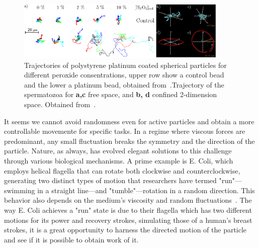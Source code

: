 \begin{figure}[h]
  \begin{center}
    \includegraphics[width=0.90\textwidth]{figures/randomwalk.pdf}
  \end{center}
  \caption[Random Walk for active brownian particles.]{Trajectories of polystyrene platinum coated spherical particles for different peroxide consentrations, upper row show a control bead and the lower a platinum bead, obtained from~\cite{howse2007self}.Trajectory of the spermatozoa for \textbf{a,c} free space, and \textbf{b, d} confined 2-dimension space. Obtained from~\cite{corkidi2008tracking}.}\label{fig:corkidiexperiment}
\end{figure}



It seems we cannot avoid randomness even for active particles and obtain a more controllable movemente for specific tasks. In a regime where viscous forces are predominant, any small fluctuation breaks the symmetry and the direction of the particle. Nature, as always, has evolved elegant solutions to this challenge through various biological mechanisms. A prime example is E. Coli, which employs helical flagella that can rotate both clockwise and counterclockwise, generating two distinct types of motion that researchers have termed "run"—swimming in a straight line—and "tumble"—rotation in a random direction. This behavior also depends on the medium's viscosity and random fluctuations~\cite{kumar2010physics}. The way E. Coli achieves a "run" state is due to their flagella which has two different motions for its power and recovery strokes, simulating those of a human's breast strokes, it is a great opportunity to harness the directed motion of the particle and see if it is possible to obtain work of it. 


